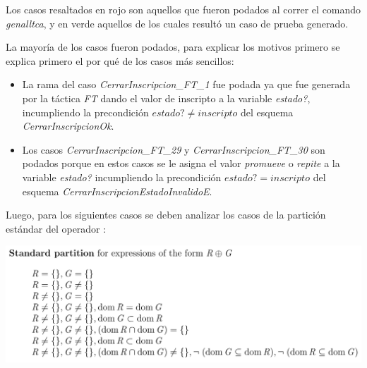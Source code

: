 \documentclass{article}
\begin{document}
Los casos resaltados en rojo son aquellos que fueron podados al correr el comando \emph{genalltca}, y en verde aquellos de los cuales resultó un caso de prueba generado.

La mayoría de los casos fueron podados, para explicar los motivos primero se explica primero el por qué de los casos más sencillos:
\begin{itemize}
    \item La rama del caso \emph{CerrarInscripcion\_FT\_1} fue podada ya que fue generada por la táctica \emph{FT} dando el valor de inscripto a la variable \emph{estado?}, incumpliendo la precondición $estado? \neq inscripto$ del esquema \emph{CerrarInscripcionOk}.
    \item Los casos \emph{CerrarInscripcion\_FT\_29} y \emph{CerrarInscripcion\_FT\_30} son podados porque en estos casos se le asigna el valor \emph{promueve} o \emph{repite} a la variable \emph{estado?} incumpliendo la precondición $estado? = inscripto$ del esquema \emph{CerrarInscripcionEstadoInvalidoE}.
\end{itemize}

Luego, para los siguientes casos se deben analizar los casos de la partición estándar del operador \oplus:

\begin{center}
    \includegraphics[width=0.8\linewidth]{sp_oplus.png}
\end{center}
\end{document}
